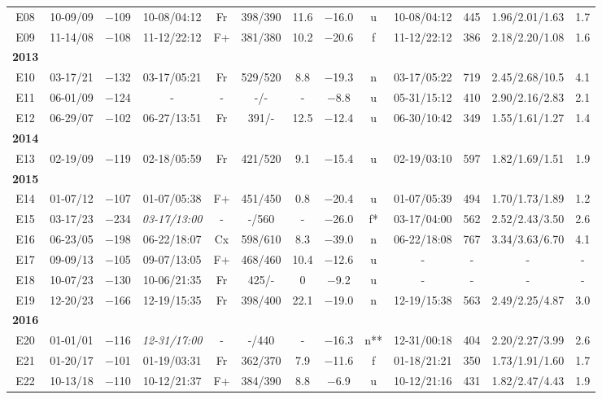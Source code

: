 \begin{landscape}
\begin{longtable}{ccccccccccccc}
			E08	& 10-09/09 & $-$109 & 10-08/04:12 & Fr & 398/390 & 11.6 & $-$16.0 &  u & 10-08/04:12 & 445 & 1.96/2.01/1.63 & 1.7 \\
			E09	& 11-14/08 & $-$108 & 11-12/22:12 & F+ & 381/380 &  10.2  & $-$20.6 &  f & 11-12/22:12 & 386 & 2.18/2.20/1.08 & 1.6	\\
			\textbf{2013}\\
			E10 & 03-17/21 & $-$132 & 03-17/05:21 & Fr & 529/520 & 8.8 & $-$19.3 &  n & 03-17/05:22 & 719 & 2.45/2.68/10.5 & 4.1 \\ 
			E11 & 06-01/09 & $-$124 & - & - & -/- & - & $-$8.8 &   u & 05-31/15:12 & 410 & 2.90/2.16/2.83 & 2.1 \\
			E12	& 06-29/07 & $-$102 & 06-27/13:51 & Fr & 391/- & 12.5 & $-$12.4 &  u & 06-30/10:42 & 349 & 1.55/1.61/1.27 & 1.4 \\
			\textbf{2014} \\
			E13	& 02-19/09 & $-$119 & 02-18/05:59 & Fr & 421/520 & 9.1 & $-$15.4 &  u & 02-19/03:10 & 597 & 1.82/1.69/1.51 & 1.9 \\
			\textbf{2015}\\
			E14	& 01-07/12 & $-$107 & 01-07/05:38 & F+ & 451/450 & 0.8 & $-$20.4 &  u & 01-07/05:39 & 494 & 1.70/1.73/1.89 & 1.2 \\
			E15 & 03-17/23 & $-$234 & {\it 03-17/13:00} & - & -/560 & - & $-$26.0 &  f* & 03-17/04:00 & 562 & 2.52/2.43/3.50 & 2.6	\\ 
			E16 & 06-23/05 & $-$198 & 06-22/18:07 & Cx & 598/610 &  8.3 & $-$39.0 &  n & 06-22/18:08 & 767 & 3.34/3.63/6.70 & 4.1	\\
			E17	& 09-09/13 & $-$105 & 09-07/13:05 & F+ & 468/460 & 10.4 & $-$12.6 &  u & - & - & - & -\\ 
			E18	& 10-07/23 & $-$130 & 10-06/21:35 & Fr & 425/- & 0 &  $-$9.2 & u & - & - & - & - \\ 
			E19	& 12-20/23 & $-$166 & 12-19/15:35 & Fr & 398/400 & 22.1 & $-$19.0 &  n & 12-19/15:38 & 563 & 2.49/2.25/4.87 & 3.0 \\ 
			\textbf{2016} \\
			E20	& 01-01/01 & $-$116 & {\it 12-31/17:00} & - & -/440 & - & $-$16.3 &   n** & 12-31/00:18 & 404 & 2.20/2.27/3.99 & 2.6 \\
			E21	& 01-20/17 & $-$101 & 01-19/03:31 & Fr & 362/370 & 7.9 & $-$11.6 &  f & 01-18/21:21 & 350 & 1.73/1.91/1.60 & 1.7 \\ 
			E22	& 10-13/18 & $-$110 & 10-12/21:37 & F+ & 384/390 &  8.8 &  $-$6.9 &  u & 10-12/21:16	& 431 & 1.82/2.47/4.43 & 1.9 \\

\end{longtable}
\end{landscape}
